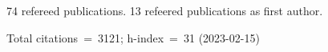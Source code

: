 74 refereed publications. 13 refeered publications as first author.

Total citations~=~3121; h-index~=~31 (2023-02-15)